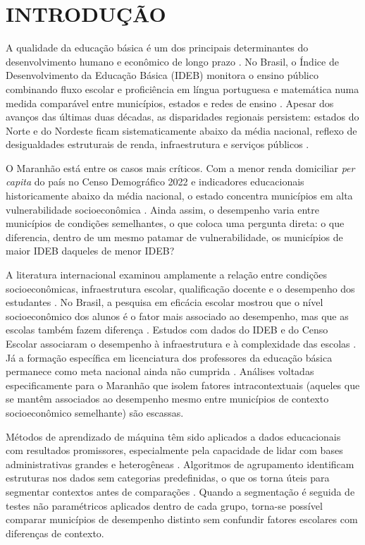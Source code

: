\section{INTRODUÇÃO}
\label{sec:intro}

A qualidade da educação básica é um dos principais determinantes do desenvolvimento humano e econômico de longo prazo \parencite{hanushek2012}. No Brasil, o Índice de Desenvolvimento da Educação Básica (IDEB) monitora o ensino público combinando fluxo escolar e proficiência em língua portuguesa e matemática numa medida comparável entre municípios, estados e redes de ensino \parencite{fernandes2007}. Apesar dos avanços das últimas duas décadas, as disparidades regionais persistem: estados do Norte e do Nordeste ficam sistematicamente abaixo da média nacional, reflexo de desigualdades estruturais de renda, infraestrutura e serviços públicos \parencite{inep2025}.

O Maranhão está entre os casos mais críticos. Com a menor renda domiciliar \textit{per capita} do país no Censo Demográfico 2022 e indicadores educacionais historicamente abaixo da média nacional, o estado concentra municípios em alta vulnerabilidade socioeconômica \parencite{ibge2022, inep2025}. Ainda assim, o desempenho varia entre municípios de condições semelhantes, o que coloca uma pergunta direta: o que diferencia, dentro de um mesmo patamar de vulnerabilidade, os municípios de maior IDEB daqueles de menor IDEB?

A literatura internacional examinou amplamente a relação entre condições socioeconômicas, infraestrutura escolar, qualificação docente e o desempenho dos estudantes \parencite{rivkin2005, coleman1966}. No Brasil, a pesquisa em eficácia escolar mostrou que o nível socioeconômico dos alunos é o fator mais associado ao desempenho, mas que as escolas também fazem diferença \parencite{brooke2008}. Estudos com dados do IDEB e do Censo Escolar associaram o desempenho à infraestrutura e à complexidade das escolas \parencite{alves2013, vasconcelos2021}. Já a formação específica em licenciatura dos professores da educação básica permanece como meta nacional ainda não cumprida \parencite{brasil2014, gatti2019}. Análises voltadas especificamente para o Maranhão que isolem fatores intracontextuais (aqueles que se mantêm associados ao desempenho mesmo entre municípios de contexto socioeconômico semelhante) são escassas.

Métodos de aprendizado de máquina têm sido aplicados a dados educacionais com resultados promissores, especialmente pela capacidade de lidar com bases administrativas grandes e heterogêneas \parencite{ersozlu2024, kalita2025, romero2020}. Algoritmos de agrupamento identificam estruturas nos dados sem categorias predefinidas, o que os torna úteis para segmentar contextos antes de comparações \parencite{faceli2021, kalita2025}. Quando a segmentação é seguida de testes não paramétricos aplicados dentro de cada grupo, torna-se possível comparar municípios de desempenho distinto sem confundir fatores escolares com diferenças de contexto.

